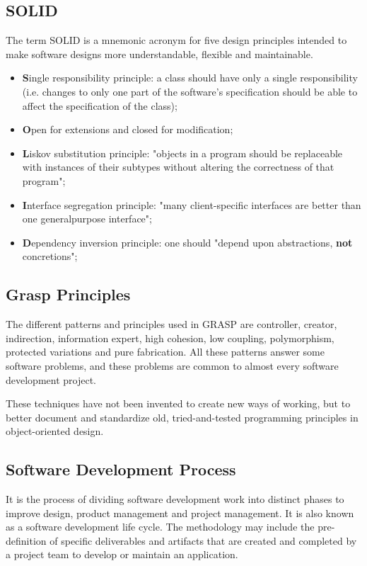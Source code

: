 \documentclass{article}
\begin{document}
		\subsection{SOLID}
			The term SOLID is a mnemonic acronym for five design principles intended to make software designs more understandable, flexible and maintainable.
			\begin{itemize}
				\item \textbf{S}ingle responsibility principle: a class should have only a single responsibility (i.e. changes to only one part of the software’s specification should be able to affect the specification of the class);
				\item \textbf{O}pen for extensions and closed for modification;
				\item \textbf{L}iskov substitution principle: "objects in a program should be replaceable with instances of their subtypes without altering the correctness of that program";
				\item \textbf{I}nterface segregation principle: "many client-specific interfaces are better than one generalpurpose interface";
				\item \textbf{D}ependency inversion principle: one should "depend upon abstractions, \textbf{not} concretions";
			\end{itemize}

		\subsection{Grasp Principles}
			The different patterns and principles used in GRASP are controller, creator, indirection, information expert, high cohesion, low coupling, polymorphism, protected variations and pure fabrication. All these patterns answer some software problems, and these problems are common to almost every software development project.

			These techniques have not been invented to create new ways of working, but to better document and standardize old, tried-and-tested programming principles in object-oriented design.

		\subsection{Software Development Process}
			It is the process of dividing software development work into distinct phases to improve design, product management and project management. It is also known as a software development life cycle. The methodology may include the pre-definition of specific deliverables and artifacts that are created and completed by a project team to develop or maintain an application.
\end{document}
